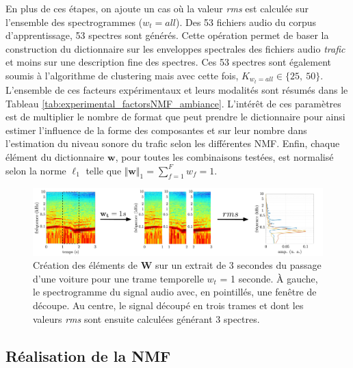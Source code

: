 En plus de ces étapes, on ajoute un cas où la valeur \textit{rms} est calculée sur l'ensemble des spectrogrammes ($w_t = all$). Des 53 fichiers audio du corpus d'apprentissage, 53 spectres sont générés. Cette opération permet de baser la construction du dictionnaire sur les enveloppes spectrales des fichiers audio \textit{trafic} et moins sur une description fine des spectres. Ces 53 spectres sont également soumis à l'algorithme de clustering mais avec cette fois, $K_{w_t = all} \in \lbrace 25,~ 50 \rbrace$.
L'ensemble de ces facteurs expérimentaux et leurs modalités sont résumés dans le Tableau \ref{tab:experimental_factorsNMF_ambiance}. L'intérêt de ces paramètres est de multiplier le nombre de format que peut prendre le dictionnaire pour ainsi estimer l'influence de la forme des composantes et sur leur nombre dans l'estimation du niveau sonore du trafic selon les différentes NMF. Enfin, chaque élément du dictionnaire $\mathbf{w}$, pour toutes les combinaisons testées, est normalisé selon la norme $\ell_1$ telle que 
$\Vert \mathbf{w} \Vert_1 = \sum_{f = 1}^{F} w_f =  1$.

\begin{figure}[hbtp]
\centering
\includegraphics[width=\linewidth]{./figures/NMF/dictionaire_frame_FR.pdf}
\caption{Création des éléments de $\mathbf{W}$ sur un extrait de 3 secondes du passage d'une voiture pour une trame temporelle $w_t$ = 1 seconde. À gauche, le spectrogramme du signal audio avec, en pointillés, une fenêtre de découpe. Au centre, le signal découpé en trois trames et dont les valeurs \textit{rms} sont ensuite calculées générant 3 spectres.}
\label{fig:decoupe_W}
\end{figure}

\subsection{Réalisation de la NMF}

